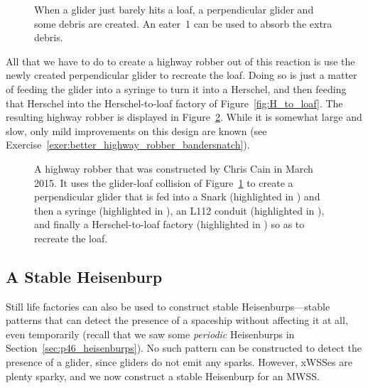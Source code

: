 \begin{figure}[!htb]
	\centering
	\caption{When a glider just barely hits a loaf, a perpendicular glider and some debris are created. An eater~1 can be used to absorb the extra debris.}
	\label{fig:glider_loaf_collision}
\end{figure}

All that we have to do to create a highway robber out of this reaction is use the newly created perpendicular glider to recreate the loaf. Doing so is just a matter of feeding the glider into a syringe to turn it into a Herschel, and then feeding that Herschel into the Herschel-to-loaf factory of Figure~\ref{fig:H_to_loaf}. The resulting highway robber is displayed in Figure~\ref{fig:highway_robber}. While it is somewhat large and slow, only mild improvements on this design are known (see Exercise~\ref{exer:better_highway_robber_bandersnatch}).

\begin{figure}[!htb]
	\centering
	\caption{A highway robber that was constructed by Chris Cain in March 2015. It uses the glider-loaf collision of Figure~\ref{fig:glider_loaf_collision} to create a perpendicular glider that is fed into a Snark (highlighted in ) and then a syringe (highlighted in ), an L112 conduit (highlighted in ), and finally a Herschel-to-loaf factory (highlighted in ) so as to recreate the loaf.}
	\label{fig:highway_robber}
\end{figure}


\subsection{A Stable Heisenburp}\label{sec:stable_heisenburp}

Still life factories can also be used to construct stable Heisenburps---stable patterns that can detect the presence of a spaceship without affecting it at all, even temporarily (recall that we saw some \emph{periodic} Heisenburps in Section~\ref{sec:p46_heisenburps}). No such pattern can be constructed to detect the presence of a glider, since gliders do not emit any sparks. However, xWSSes are plenty sparky, and we now construct a stable Heisenburp for an MWSS.

